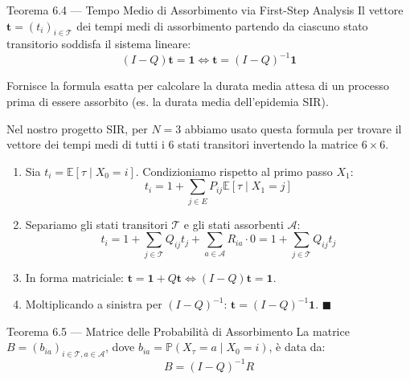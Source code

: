 \documentclass[11pt,a4paper]{report}
\newcommand{\PP}{\mathbb{P}}
\newcommand{\E}{\mathbb{E}}
\newcommand{\1}{\mathbf{1}}
\begin{document}
\vspace{0.4cm}

\begin{teoremabox}{Teorema 6.4 --- Tempo Medio di Assorbimento via First-Step Analysis}
Il vettore $\mathbf{t} = (t_i)_{i \in \mathcal{T}}$ dei tempi medi di assorbimento partendo da ciascuno stato transitorio soddisfa il sistema lineare:
\[ (I - Q)\mathbf{t} = \mathbf{1} \iff \mathbf{t} = (I - Q)^{-1}\mathbf{1} \]
\end{teoremabox}

\begin{cosafa}
Fornisce la formula esatta per calcolare la durata media attesa di un processo prima di essere assorbito (es. la durata media dell'epidemia SIR).
\end{cosafa}

\begin{acosaserve}
Nel nostro progetto SIR, per $N=3$ abbiamo usato questa formula per trovare il vettore dei tempi medi di tutti i 6 stati transitori invertendo la matrice $6 \times 6$.
\end{acosaserve}

\begin{dimostrazione}
\begin{enumerate}
    \item Sia $t_i = \E[\tau \mid X_0 = i]$. Condizioniamo rispetto al primo passo $X_1$:
    \[ t_i = 1 + \sum_{j \in E} P_{ij} \E[\tau \mid X_1 = j] \]
    \item Separiamo gli stati transitori $\mathcal{T}$ e gli stati assorbenti $\mathcal{A}$:
    \[ t_i = 1 + \sum_{j \in \mathcal{T}} Q_{ij} t_j + \sum_{a \in \mathcal{A}} R_{ia} \cdot 0 = 1 + \sum_{j \in \mathcal{T}} Q_{ij} t_j \]
    \item In forma matriciale: $\mathbf{t} = \mathbf{1} + Q \mathbf{t} \iff (I - Q)\mathbf{t} = \mathbf{1}$.
    \item Moltiplicando a sinistra per $(I-Q)^{-1}$: $\mathbf{t} = (I - Q)^{-1}\mathbf{1}$. $\blacksquare$
\end{enumerate}
\end{dimostrazione}

\vspace{0.4cm}

\begin{teoremabox}{Teorema 6.5 --- Matrice delle Probabilità di Assorbimento}
La matrice $B = (b_{ia})_{i \in \mathcal{T}, a \in \mathcal{A}}$, dove $b_{ia} = \PP(X_\tau = a \mid X_0 = i)$, è data da:
\[ B = (I - Q)^{-1} R \]
\end{teoremabox}
\end{document}
